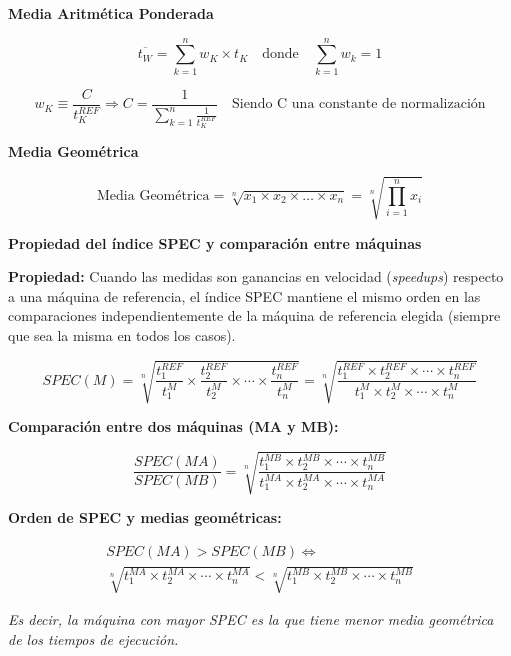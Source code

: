 \documentclass[a4paper,12pt]{article}
\begin{document}
    \textbf{Media Aritmética Ponderada}
    \begin{tcolorbox}[colback=yellow!5!white, colframe=yellow!75!black]
    $$
    \overline{t_W} =  \sum_{k=1}^{n} w_K \times t_K \quad \text{donde} \quad \sum_{k=1}^{n} w_k = 1
    $$
    \end{tcolorbox}

    \begin{tcolorbox}[colback=yellow!5!white, colframe=yellow!75!black]
        $$
        w_K \equiv \frac{C}{t_K^{REF}} \Rightarrow C = \frac{1}{\sum_{k=1}^{n}\frac{1}{t_K^{REF}}} \quad \text{Siendo C una constante de normalización}
        $$
        \end{tcolorbox}

    \textbf{Media Geométrica}
    \begin{tcolorbox}[colback=yellow!5!white, colframe=yellow!75!black]
    $$
    \text{Media Geométrica} = \sqrt[n]{x_1 \times x_2 \times \ldots \times x_n} = \sqrt[n]{\prod_{i=1}^n x_i}
    $$
    \end{tcolorbox}

    \textbf{Propiedad del índice SPEC y comparación entre máquinas}

    \begin{tcolorbox}[colback=yellow!5!white, colframe=yellow!75!black]
    \textbf{Propiedad:} Cuando las medidas son ganancias en velocidad (\textit{speedups}) respecto a una máquina de referencia, el índice SPEC mantiene el mismo orden en las comparaciones independientemente de la máquina de referencia elegida (siempre que sea la misma en todos los casos).

    \[
    SPEC(M) = \sqrt[n]{\frac{t_1^{REF}}{t_1^M} \times \frac{t_2^{REF}}{t_2^M} \times \cdots \times \frac{t_n^{REF}}{t_n^M}} = \sqrt[n]{\frac{t_1^{REF} \times t_2^{REF} \times \cdots \times t_n^{REF}}{t_1^M \times t_2^M \times \cdots \times t_n^M}}
    \]
    \end{tcolorbox}

    \begin{tcolorbox}[colback=yellow!5!white, colframe=yellow!75!black]
    \textbf{Comparación entre dos máquinas (MA y MB):}

    \[
    \frac{SPEC(MA)}{SPEC(MB)} = \sqrt[n]{\frac{t_1^{MB} \times t_2^{MB} \times \cdots \times t_n^{MB}}{t_1^{MA} \times t_2^{MA} \times \cdots \times t_n^{MA}}}
    \]
    \end{tcolorbox}

    \begin{tcolorbox}[colback=yellow!5!white, colframe=yellow!75!black]
    \textbf{Orden de SPEC y medias geométricas:}

    \begin{align*}
        SPEC(MA) > SPEC(MB) \iff  \\ 
        \sqrt[n]{t_1^{MA} \times t_2^{MA} \times \cdots \times t_n^{MA}} < \sqrt[n]{t_1^{MB} \times t_2^{MB} \times \cdots \times t_n^{MB}}
    \end{align*}
    
    

    \textit{Es decir, la máquina con mayor SPEC es la que tiene menor media geométrica de los tiempos de ejecución.}
    \end{tcolorbox}
\end{document}
